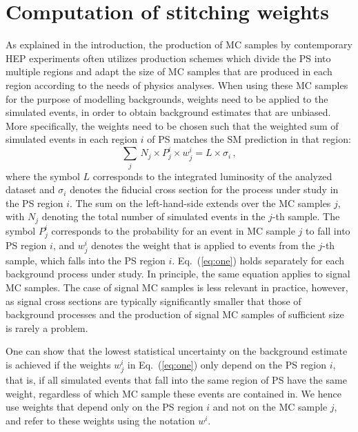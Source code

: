 \section{Computation of stitching weights}
\label{sec:stitching_weights}

As explained in the introduction,
the production of MC samples by contemporary HEP experiments often utilizes production schemes
which divide the PS into multiple regions and adapt the size of MC samples that are produced in each region 
according to the needs of physics analyses.
When using these MC samples for the purpose of modelling backgrounds,
weights need to be applied to the simulated events, in order to obtain background estimates that are unbiased.
More specifically, the weights need to be chosen such that the weighted sum of simulated events in each region $i$ of PS 
matches the SM prediction in that region:
\begin{equation}
\sum_{j} \, N_{j} \times P_{j}^{i} \times w_{j}^{i} = L \times \sigma_{i} \, ,
\label{eq:one}
\end{equation}
where the symbol $L$ corresponds to the integrated luminosity of the analyzed dataset
and $\sigma_{i}$ denotes the fiducial cross section for the process under study in the PS region $i$.
The sum on the left-hand-side extends over the MC samples $j$,
with $N_{j}$ denoting the total number of simulated events in the $j$-th sample.
The symbol $P_{j}^{i}$ corresponds to the probability for an event in MC sample $j$ to fall into PS region $i$,
and $w_{j}^{i}$ denotes the weight that is applied to events from the $j$-th sample,
which falls into the PS region $i$.
Eq.~(\ref{eq:one}) holds separately for each background process under study.
In principle, the same equation applies to signal MC samples. 
The case of signal MC samples is less relevant in practice, however,
as signal cross sections are typically significantly smaller that those of background processes 
and the production of signal MC samples of sufficient size is rarely a problem.

One can show that the lowest statistical uncertainty on the background estimate is achieved 
if the weights $w_{j}^{i}$ in Eq.~(\ref{eq:one}) only depend on the PS region $i$,
that is, if all simulated events that fall into the same region of PS have the same weight,
regardless of which MC sample these events are contained in.
We hence use weights that depend only on the PS region $i$ and not on the MC sample $j$, 
and refer to these weights using the notation $w^{i}$.

